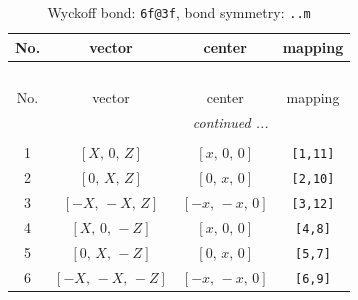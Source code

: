 \documentclass[fleqn,8pt]{jsarticle}
\begin{document}
\begin{longtable}{cccc}
\caption{Wyckoff bond: {\tt 6f@3f}, bond symmetry: {\tt ..m}}
 \\
 \hline \hline
No. & vector & center & mapping \\ \hline \endfirsthead

\multicolumn{3}{l}{\tablename\ \thetable{}} \\
 \hline \hline
No. & vector & center & mapping \\ \hline \endhead

 \hline \hline
\multicolumn{3}{r}{\footnotesize\it continued ...} \\ \endfoot

 \hline \hline
\multicolumn{3}{r}{} \\ \endlastfoot

1 & $\left[ X,\, 0,\, Z \right]$ & $\left[ x,\, 0,\, 0 \right]$ & {\tt [1,11]} \\ \hline
2 & $\left[ 0,\, X,\, Z \right]$ & $\left[ 0,\, x,\, 0 \right]$ & {\tt [2,10]} \\ \hline
3 & $\left[ - X,\, - X,\, Z \right]$ & $\left[ - x,\, - x,\, 0 \right]$ & {\tt [3,12]} \\ \hline
4 & $\left[ X,\, 0,\, - Z \right]$ & $\left[ x,\, 0,\, 0 \right]$ & {\tt [4,8]} \\ \hline
5 & $\left[ 0,\, X,\, - Z \right]$ & $\left[ 0,\, x,\, 0 \right]$ & {\tt [5,7]} \\ \hline
6 & $\left[ - X,\, - X,\, - Z \right]$ & $\left[ - x,\, - x,\, 0 \right]$ & {\tt [6,9]} \\
\end{longtable}
\renewcommand{\arraystretch}{1.2}
\end{document}
